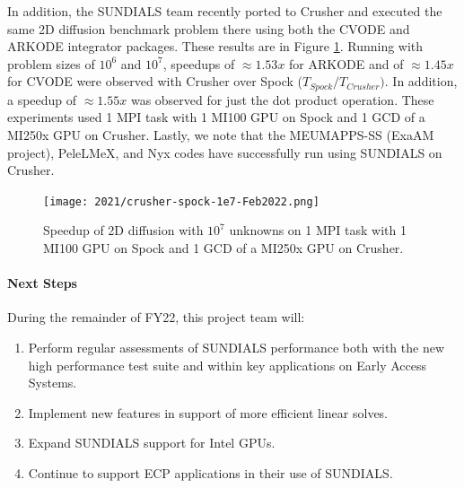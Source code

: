In addition, the SUNDIALS team recently ported to Crusher and executed the same 2D diffusion benchmark problem there using both the CVODE and ARKODE integrator packages.  
These results are in Figure \ref{fig:sun-crusher-spock-2-22}.
Running with problem sizes of $10^6$ and $10^7$, speedups of $\approx 1.53x$ for ARKODE and of $\approx 1.45x$ for CVODE were observed with Crusher over Spock ($T_{Spock} / T_{Crusher}).$  In addition, a speedup of $\approx 1.55x$ was observed for just the dot product operation.  These experiments used 1 MPI task with 1 MI100 GPU on Spock and 1 GCD of a MI250x GPU on Crusher.  Lastly, we note that the MEUMAPPS-SS (ExaAM project), PeleLMeX, and Nyx codes have successfully run using SUNDIALS on Crusher.

\begin{figure}[htb]
	\centering
	\texttt{[image: 2021/crusher-spock-1e7-Feb2022.png]}
	\caption{\label{fig:sun-crusher-spock-2-22} Speedup of 2D diffusion with $10^7$ unknowns on 1 MPI task with 1 MI100 GPU on Spock and 1 GCD of a MI250x GPU on Crusher.}
\end{figure}

\paragraph{Next Steps}

During the remainder of FY22, this project team will:
\begin{enumerate}
  \item Perform regular assessments of SUNDIALS performance both with the new
        high performance test suite and within key applications on Early Access
        Systems.
  \item Implement new features in support of more efficient linear solves.
  \item Expand SUNDIALS support for Intel GPUs.
  \item Continue to support ECP applications in their use of SUNDIALS.
\end{enumerate}
